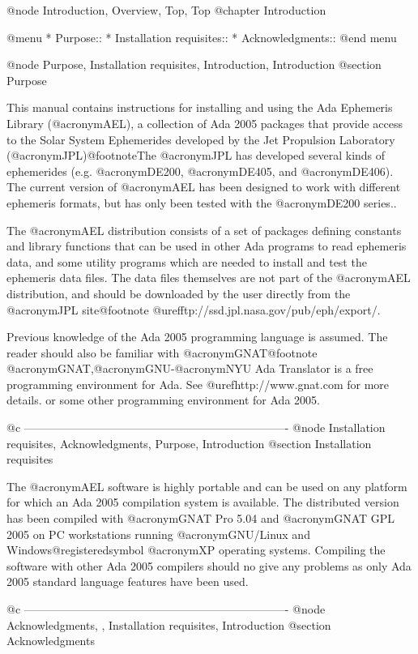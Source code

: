 @node Introduction, Overview, Top, Top
@chapter Introduction

@menu
* Purpose::                     
* Installation requisites::     
* Acknowledgments::             
@end menu

@node Purpose, Installation requisites, Introduction, Introduction
@section Purpose

This manual contains instructions for installing and using the Ada
Ephemeris Library (@acronym{AEL}), a collection of Ada 2005 packages
that provide access to the Solar System Ephemerides developed by the
Jet Propulsion Laboratory (@acronym{JPL})@footnote{The @acronym{JPL}
has developed several kinds of ephemerides (e.g.  @acronym{DE200},
@acronym{DE405}, and @acronym{DE406}).  The current version of
@acronym{AEL} has been designed to work with different ephemeris
formats, but has only been tested with the @acronym{DE200} series.}.

The @acronym{AEL} distribution consists of a set of packages defining
constants and library functions that can be used in other Ada programs
to read ephemeris data, and some utility programs which are needed to
install and test the ephemeris data files. The data files themselves
are not part of the @acronym{AEL} distribution, and should be
downloaded by the user directly from the @acronym{JPL} site@footnote{
@uref{ftp://ssd.jpl.nasa.gov/pub/eph/export/}}.

Previous knowledge of the Ada 2005 programming language is
assumed. The reader should also be familiar with
@acronym{GNAT}@footnote{ @acronym{GNAT,@acronym{GNU}-@acronym{NYU} Ada
Translator} is a free programming environment for Ada.  See
@uref{http://www.gnat.com} for more details.} or some other
programming environment for Ada 2005.

@c ----------------------------------------------------------------------
@node    Installation requisites, Acknowledgments, Purpose, Introduction
@section Installation requisites

The @acronym{AEL} software is highly portable and can be used on any
platform for which an Ada 2005 compilation system is available. The
distributed version has been compiled with @acronym{GNAT} Pro 5.04 and
@acronym{GNAT GPL} 2005 on PC workstations running @acronym{GNU}/Linux
and Windows@registeredsymbol{} @acronym{XP} operating
systems. Compiling the software with other Ada 2005 compilers should
no give any problems as only Ada 2005 standard language features have
been used.

@c ----------------------------------------------------------------------
@node Acknowledgments,  , Installation requisites, Introduction
@section Acknowledgments

